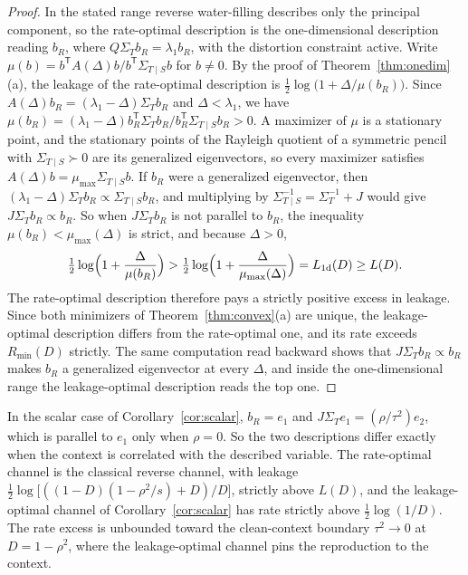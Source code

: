 \documentclass[11pt,onecolumn]{IEEEtran}
\newcommand{\Kc}{\Sigma_{T\mid S}}
\begin{document}
\begin{proof}
In the stated range reverse water-filling describes only the principal
component, so the rate-optimal description is the one-dimensional
description reading $b_R$, where $Q\Sigma_Tb_R=\lambda_1b_R$, with the
distortion constraint active. Write
$\mu(b)=b^{\mathsf T}A(\Delta)b/b^{\mathsf T}\Kc b$ for $b\ne0$. By the proof
of Theorem~\ref{thm:onedim}(a), the leakage of the rate-optimal
description is $\tfrac12\log\bigl(1+\Delta/\mu(b_R)\bigr)$. Since
$A(\Delta)b_R=(\lambda_1-\Delta)\Sigma_Tb_R$ and $\Delta<\lambda_1$, we have
$\mu(b_R)=(\lambda_1-\Delta)b_R^{\mathsf T}\Sigma_Tb_R/b_R^{\mathsf T}\Kc b_R>0$.
A maximizer of $\mu$ is a stationary point, and the stationary points of
the Rayleigh quotient of a symmetric pencil with $\Kc\succ0$ are its
generalized eigenvectors, so every maximizer satisfies
$A(\Delta)b=\mu_{\max}\Kc b$. If $b_R$ were a generalized eigenvector, then
$(\lambda_1-\Delta)\Sigma_Tb_R\propto\Kc b_R$, and multiplying by
$\Kc^{-1}=\Sigma_T^{-1}+J$ would give $J\Sigma_Tb_R\propto b_R$. So when
$J\Sigma_Tb_R$ is not parallel to $b_R$, the inequality
$\mu(b_R)<\mu_{\max}(\Delta)$ is strict, and because $\Delta>0$,
\[
\tfrac12\log\Bigl(1+\frac{\Delta}{\mu(b_R)}\Bigr)
>\tfrac12\log\Bigl(1+\frac{\Delta}{\mu_{\max}(\Delta)}\Bigr)
=L_{\mathrm{1d}}(D)\ge L(D).
\]
The rate-optimal description therefore pays a strictly positive excess in
leakage. Since both minimizers of Theorem~\ref{thm:convex}(a) are unique,
the leakage-optimal description differs from the rate-optimal one, and
its rate exceeds $R_{\min}(D)$ strictly.
The same computation read backward shows that $J\Sigma_Tb_R\propto b_R$
makes $b_R$ a generalized eigenvector at every $\Delta$, and inside the
one-dimensional range the leakage-optimal description reads the top
one.
\end{proof}

In the scalar case of Corollary~\ref{cor:scalar}, $b_R=e_1$ and
$J\Sigma_Te_1=(\rho/\tau^2)e_2$, which is parallel to $e_1$ only when
$\rho=0$. So the two descriptions differ exactly when the context is
correlated with the described variable. The rate-optimal channel is the
classical reverse channel, with leakage
$\tfrac12\log\bigl[((1-D)(1-\rho^2/s)+D)/D\bigr]$, strictly above $L(D)$,
and the leakage-optimal channel of Corollary~\ref{cor:scalar} has rate
strictly above $\tfrac12\log(1/D)$. The rate excess is unbounded toward the
clean-context boundary $\tau^2\to0$ at $D=1-\rho^2$, where the
leakage-optimal channel pins the reproduction to the context.
\end{document}
